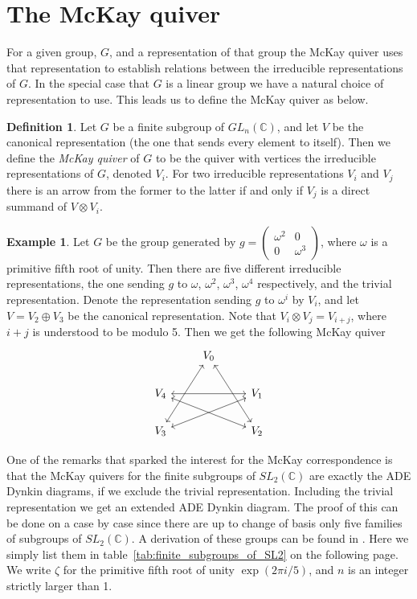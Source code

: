\documentclass[11pt, a4paper, english]{article}
\theoremstyle{definition}
\newtheorem{defin}[theorem]{Definition}
\newtheorem{example}[theorem]{Example}
\newcommand{\C}{\mathbb{C}}
\begin{document}
\section{The McKay quiver}
For a given group, $G$, and a representation of that group the McKay quiver uses that representation to establish relations between the irreducible representations of $G$. In the special case that $G$ is a linear group we have a natural choice of representation to use. This leads us to define the McKay quiver as below.
\begin{defin}
Let $G$ be a finite subgroup of $GL_n(\C)$, and let $V$ be the canonical representation (the one that sends every element to itself). Then we define the \textit{McKay quiver} of $G$ to be the quiver with vertices the irreducible representations of $G$, denoted $V_i$. For two irreducible representations $V_i$ and $V_j$ there is an arrow from the former to the latter if and only if $V_j$ is a direct summand of $V \otimes V_i$.
\end{defin}

\begin{example}
Let $G$ be the group generated by $g =\begin{pmatrix}
\omega^2 & 0\\
0 & \omega^{3}
\end{pmatrix}$, where $\omega$ is a primitive fifth root of unity. Then there are five different irreducible representations, the one sending $g$ to $\omega$, $\omega^2$, $\omega^3$, $\omega^4$ respectively, and the trivial representation. Denote the representation sending $g$ to $\omega^i$ by $V_i$, and let $V = V_2 \oplus V_3$ be the canonical representation. Note that $V_i \otimes V_j = V_{i+j}$, where $i+j$ is understood to be modulo 5. Then we get the following McKay quiver
$$
\begin{tikzcd}
& V_0 \arrow[<->]{ddr} \arrow[<->]{ddl} & \\
V_4 && V_1 \arrow[<->]{ll}\arrow[<->]{dll}\\
V_3 && V_2 \arrow[<->]{ull}
\end{tikzcd} 
$$
\end{example}

One of the remarks that sparked the interest for the McKay correspondence is that the McKay quivers for the finite subgroups of $SL_2(\C)$ are exactly the ADE Dynkin diagrams, if we exclude the trivial representation. Including the trivial representation we get an extended ADE Dynkin diagram. The proof of this can be done on a case by case since there are up to change of basis only five families of subgroups of $SL_2(\C)$. A derivation of these groups can be found in \cite{Carrasco}. Here we simply list them in table~\ref{tab:finite_subgroups_of_SL2} on the following page. We write $\zeta$ for the primitive fifth root of unity $\exp(2\pi i/5)$, and $n$ is an integer strictly larger than 1.
\end{document}
